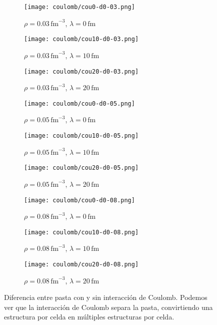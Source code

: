 \begin{figure}
\centering
\begin{subfigure}[h!]{0.3\columnwidth}
  \centering
  \texttt{[image: coulomb/cou0-d0-03.png]}
  \caption{$\rho=0.03\,\text{fm}^{-3}$, $\lambda=0\,\text{fm}$}
\end{subfigure}
\begin{subfigure}[h!]{0.3\columnwidth}
  \centering
  \texttt{[image: coulomb/cou10-d0-03.png]}
  \caption{$\rho=0.03\,\text{fm}^{-3}$, $\lambda=10\,\text{fm}$}
\end{subfigure}
\begin{subfigure}[h!]{0.3\columnwidth}
  \centering
  \texttt{[image: coulomb/cou20-d0-03.png]}
  \caption{$\rho=0.03\,\text{fm}^{-3}$, $\lambda=20\,\text{fm}$}
\end{subfigure}

\begin{subfigure}[h!]{0.3\columnwidth}
  \centering
  \texttt{[image: coulomb/cou0-d0-05.png]}
  \caption{$\rho=0.05\,\text{fm}^{-3}$, $\lambda=0\,\text{fm}$}
\end{subfigure}
\begin{subfigure}[h!]{0.3\columnwidth}
  \centering
  \texttt{[image: coulomb/cou10-d0-05.png]}
  \caption{$\rho=0.05\,\text{fm}^{-3}$, $\lambda=10\,\text{fm}$}
\end{subfigure}
\begin{subfigure}[h!]{0.3\columnwidth}
  \centering
  \texttt{[image: coulomb/cou20-d0-05.png]}
  \caption{$\rho=0.05\,\text{fm}^{-3}$, $\lambda=20\,\text{fm}$}
\end{subfigure}

\begin{subfigure}[h!]{0.3\columnwidth}
  \centering
  \texttt{[image: coulomb/cou0-d0-08.png]}
  \caption{$\rho=0.08\,\text{fm}^{-3}$, $\lambda=0\,\text{fm}$}
\end{subfigure}
\begin{subfigure}[h!]{0.3\columnwidth}
  \centering
  \texttt{[image: coulomb/cou10-d0-08.png]}
  \caption{$\rho=0.08\,\text{fm}^{-3}$, $\lambda=10\,\text{fm}$}
\end{subfigure}
\begin{subfigure}[h!]{0.3\columnwidth}
  \centering
  \texttt{[image: coulomb/cou20-d0-08.png]}
  \caption{$\rho=0.08\,\text{fm}^{-3}$, $\lambda=20\,\text{fm}$}
\end{subfigure}
\caption{Diferencia entre pasta con y sin interacción de Coulomb.
  Podemos ver que la interacción de Coulomb separa la pasta, convirtiendo una estructura por celda en múltiples estructuras por celda.}
\label{fig:w-wo-coulomb}
\end{figure}

